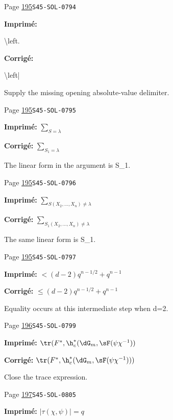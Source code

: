 \begin{description}
\smallskip
\item[\hypertarget{apparatus:FR-0171}{171}] Page \hyperlink{printpage:fr:195}{195}\quad\texttt{S45-SOL-0794}
\par\noindent\textbf{Imprimé:} {\footnotesize\ttfamily\raggedright \textbackslash{}\allowbreak{}left.}
\par\noindent\textbf{Corrigé:} {\footnotesize\ttfamily\raggedright \textbackslash{}\allowbreak{}left|}
\par\noindent Supply the missing opening absolute-value delimiter.
\smallskip
\item[\hypertarget{apparatus:FR-0172}{172}] Page \hyperlink{printpage:fr:195}{195}\quad\texttt{S45-SOL-0795}
\par\noindent\textbf{Imprimé:} \(\sum_{S=\lambda}\)
\par\noindent\textbf{Corrigé:} \(\sum_{S_1=\lambda}\)
\par\noindent The linear form in the argument is S\_1.
\smallskip
\item[\hypertarget{apparatus:FR-0173}{173}] Page \hyperlink{printpage:fr:195}{195}\quad\texttt{S45-SOL-0796}
\par\noindent\textbf{Imprimé:} \(\sum_{S(X_2,\dots,X_n)\ne\lambda}\)
\par\noindent\textbf{Corrigé:} \(\sum_{S_1(X_2,\dots,X_n)\ne\lambda}\)
\par\noindent The same linear form is S\_1.
\smallskip
\item[\hypertarget{apparatus:FR-0174}{174}] Page \hyperlink{printpage:fr:195}{195}\quad\texttt{S45-SOL-0797}
\par\noindent\textbf{Imprimé:} \(< (d-2) q^{n-1/2} + q^{n-1}\)
\par\noindent\textbf{Corrigé:} \(\leqslant (d-2) q^{n-1/2} + q^{n-1}\)
\par\noindent Equality occurs at this intermediate step when d=2.
\smallskip
\item[\hypertarget{apparatus:FR-0175}{175}] Page \hyperlink{printpage:fr:196}{196}\quad\texttt{S45-SOL-0799}
\par\noindent\textbf{Imprimé:} \(\tr(F^\ast,\h_c^\ast(\dG_m,\sF(\psi \chi^{-1}))\)
\par\noindent\textbf{Corrigé:} \(\tr(F^\ast,\h_c^\ast(\dG_m,\sF(\psi \chi^{-1})))\)
\par\noindent Close the trace expression.
\smallskip
\item[\hypertarget{apparatus:FR-0176}{176}] Page \hyperlink{printpage:fr:197}{197}\quad\texttt{S45-SOL-0805}
\par\noindent\textbf{Imprimé:} \(|\tau(\chi,\psi)|=q\)

\end{description}
